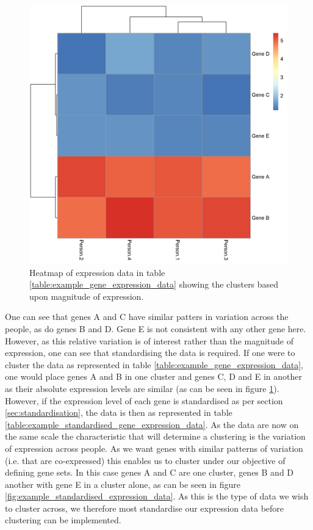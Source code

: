 \documentclass[12pt]{article} %
\begin{document}
	\begin{figure}[h]
	\centering
		\includegraphics[scale=0.6]{Images/Examples/example_expression_data.png}
		\caption{Heatmap of expression data in table \ref{table:example_gene_expression_data} showing the clusters based upon magnitude of expression.}
		\label{fig:example_expression_data}
	\end{figure}
	
	One can see that genes A and C have similar patters in variation across the people, as do genes B and D. Gene E is not consistent with any other gene here. However, as this relative variation is of interest rather than the magnitude of expression, one can see that standardising the data is required. If one were to cluster the data as represented in table \ref{table:example_gene_expression_data}, one would place genes A and B in one cluster and genes C, D and E in another as their absolute expression levels are similar (as can be seen in figure \ref{fig:example_expression_data}). However, if the expression level of each gene is standardised as per section \ref{sec:standardisation}, the data is then as represented in table \ref{table:example_standardised_gene_expression_data}. As the data are now on the same scale the characteristic that will determine a clustering is the variation of expression across people. As we want genes with similar patterns of variation (i.e. that are co-expressed) this enables us to cluster under our objective of defining gene sets. In this case genes A and C are one cluster, genes B and D another with gene E in a cluster alone, as can be seen in figure \ref{fig:example_standardised_expression_data}. As this is the type of data we wish to cluster across, we therefore most standardise our expression data before clustering can be implemented.
\end{document}
